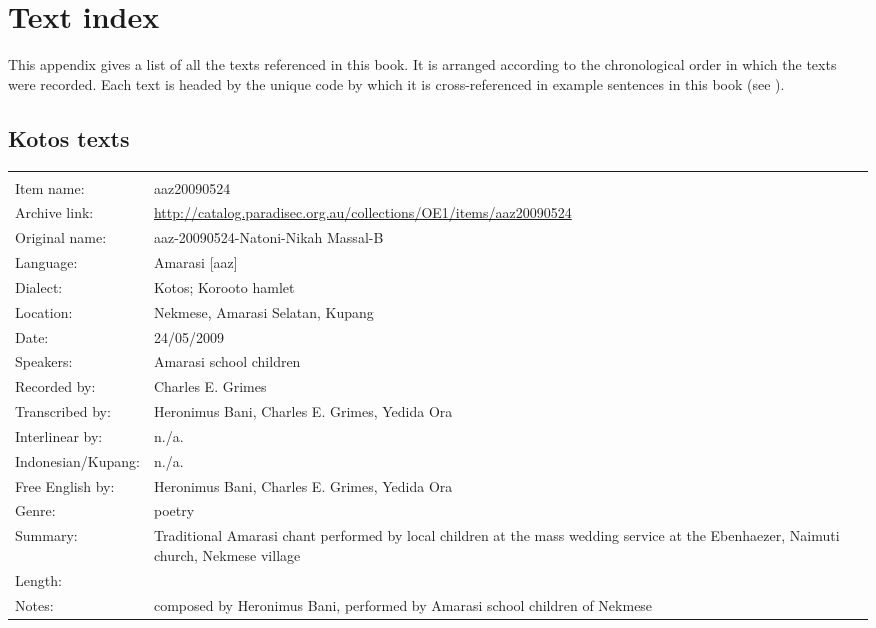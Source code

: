 \chapter{Text index}\label{app:TexInd}
This appendix gives a list of all the texts referenced in this book.
It is arranged according to the chronological
order in which the texts were recorded.
Each text is headed by the unique code by which it is cross-referenced
in example sentences in this book (see ).

\section{Kotos texts}

\noindent
\wg\begin{tabular}{lL{.67\textwidth}}
			& \\
Item name:			& aaz20090524\\
Archive link:			& \url{http://catalog.paradisec.org.au/collections/OE1/items/aaz20090524}\\
Original name:			& aaz-20090524-Natoni-Nikah Massal-B\\
Language:				& Amarasi [aaz] \\
Dialect:				& Kotos; Koro{\Q}oto hamlet \\
Location:				& Nekmese{\Q}, Amarasi Selatan, Kupang \\
Date:				& 24/05/2009\\
Speakers:				& Amarasi school children\\
Recorded by:			& Charles E. Grimes\\
Transcribed by:		& Heronimus Bani, Charles E. Grimes, Yedida Ora\\
Interlinear by:		& n./a.\\
Indonesian/Kupang:		& n./a.\\
Free English by:		& Heronimus Bani, Charles E. Grimes, Yedida Ora\\
Genre:				& poetry\\
Summary:				& Traditional Amarasi chant performed by local children at the mass wedding service at the Ebenhaezer, Naimuti{\Q} church, Nekmese{\Q} village\\
Length:				& \\
Notes:				& composed by Heronimus Bani, performed by Amarasi school children of Nekmese{\Q}\\
\end{tabular}

